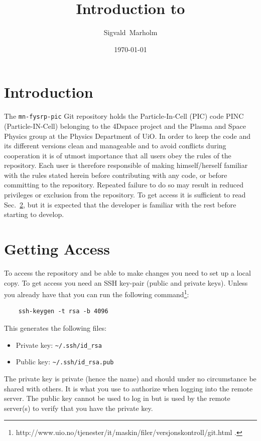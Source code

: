 \documentclass[10pt,a4paper]{article}
\author{Sigvald~Marholm}
\title{Introduction to \mnfysrppic}
\date{\today}
\newcommand{\mnfysrppic}{\texttt{mn-fysrp-pic}}
\newcommand{\refsec}[1]{Sec.~\ref{sec:#1}}
\begin{document}
\maketitle
\newpage

\section{Introduction}
The \mnfysrppic{} Git repository holds the Particle-In-Cell (PIC) code PINC (Particle-IN-Cell) belonging to the 4Dspace project and the Plasma and Space Physics group at the Physics Department of UiO. In order to keep the code and its different versions clean and manageable and to avoid conflicts during cooperation it is of utmost importance that all users obey the rules of the repository. Each user is therefore responsible of making himself/herself familiar with the rules stated herein before contributing with any code, or before committing to the repository. Repeated failure to do so may result in reduced privileges or exclusion from the repository. To get access it is sufficient to read \refsec{access}, but it is expected that the developer is familiar with the rest before starting to develop.



\section{Getting Access}\label{sec:access}
To access the repository and be able to make changes you need to set up a local copy. To get access you need an SSH key-pair (public and private keys). Unless you already have that you can run the following command\footnote{http://www.uio.no/tjenester/it/maskin/filer/versjonskontroll/git.html .}:

\begin{verbatim}
	ssh-keygen -t rsa -b 4096
\end{verbatim}
This generates the following files:

\begin{itemize}
	\item Private key: \verb$~/.ssh/id_rsa$
	\item Public key: \verb$~/.ssh/id_rsa.pub$
\end{itemize}
The private key is private (hence the name) and should under no circumstance be shared with others. It is what you use to authorize when logging into the remote server. The public key cannot be used to log in but is used by the remote server(s) to verify that you have the private key.
\end{document}
